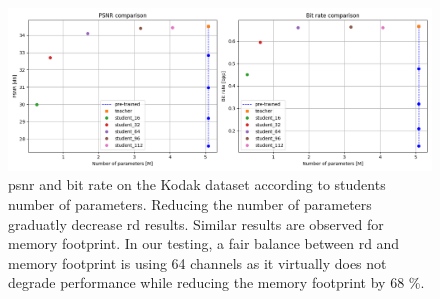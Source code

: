 \begin{figure}
    \centering
    \includegraphics[width=15cm]{../img/kd_lic_parameters.png}
    \caption[\acrshort{psnr} and bit rate on the Kodak dataset according to students number of parameters.]{\acrshort{psnr} and bit rate on the Kodak dataset according to students number of parameters. Reducing the number of parameters graduatly decrease \acrshort{rd} results. Similar results are observed for memory footprint. In our testing, a fair balance between \acrshort{rd} and memory footprint is using 64 channels as it virtually does not degrade performance while reducing the memory footprint by 68 \%.}
    \label{kd_lic_parameters}
\end{figure}

